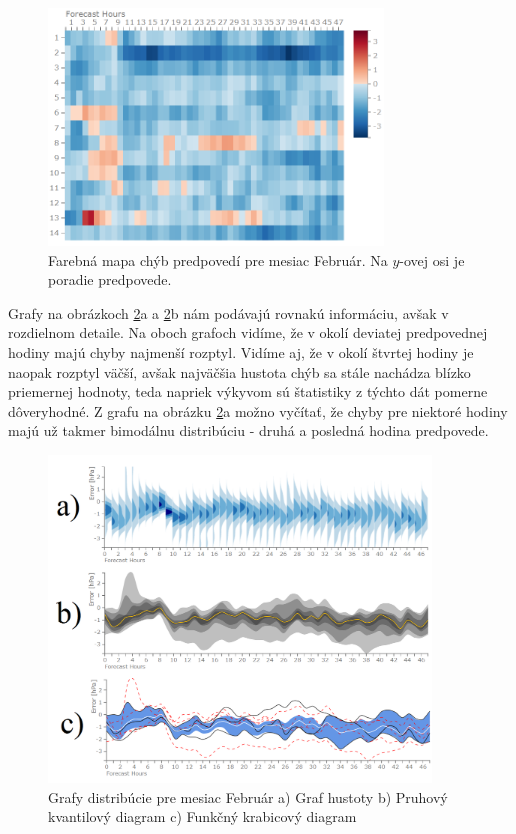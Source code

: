 \begin{figure}
	\centering
	\includegraphics[width = 3.5in]{errors}
	\caption{Farebná mapa chýb predpovedí pre mesiac Február. Na \mbox{$ y $-ovej} osi je poradie predpovede.}
	\label{fig:errors} 
\end{figure}

Grafy na obrázkoch \ref{fig:distrib}a a \ref{fig:distrib}b nám podávajú rovnakú informáciu, avšak v rozdielnom detaile. Na oboch grafoch vidíme, že v okolí deviatej predpovednej hodiny majú chyby najmenší rozptyl. Vidíme aj, že v okolí štvrtej hodiny je naopak rozptyl väčší, avšak najväčšia hustota chýb sa stále nachádza blízko priemernej hodnoty, teda napriek výkyvom sú štatistiky z týchto dát pomerne dôveryhodné. Z grafu na obrázku \ref{fig:distrib}a možno vyčítať, že chyby pre niektoré hodiny majú už takmer bimodálnu distribúciu - druhá a posledná hodina predpovede.


\begin{figure}
	\centering
	\includegraphics[width = 4in]{distrib}
	\caption{Grafy distribúcie pre mesiac Február a) Graf hustoty b) Pruhový kvantilový diagram c) Funkčný krabicový diagram}
	\label{fig:distrib} 
\end{figure}

